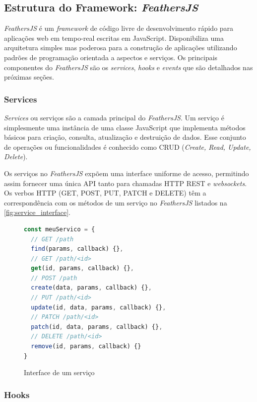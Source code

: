 \subsection{Estrutura do Framework: \textit{FeathersJS}}

\textit{FeathersJS} é um \textit{framework} de código livre de desenvolvimento rápido para aplicações
web em tempo-real escritas em JavaScript. Disponibiliza uma arquitetura simples mas poderosa
para a construção de aplicações utilizando padrões de programação orientada a aspectos e serviços.
Os principais componentes do \textit{FeathersJS} são os \textit{services}, \textit{hooks} e
\textit{events} que são detalhados nas próximas seções.

\subsubsection{Services}\label{subsection:feathers_services}
\textit{Services} ou serviços são a camada principal do \textit{\textit{FeathersJS}}.
Um serviço é simplesmente uma instância de uma classe JavaScript
que implementa métodos básicos para criação, consulta, atualização e
destruição de dados. Esse conjunto de operações ou funcionalidades é conhecido como
CRUD (\textit{Create, Read, Update, Delete}).

Os serviços no \textit{FeathersJS} expõem uma interface uniforme de acesso, permitindo
assim fornecer uma única API tanto para chamadas HTTP REST e \textit{websockets}.
Os verbos HTTP (GET, POST, PUT, PATCH e DELETE) têm a correspondência com
os métodos de um serviço no \textit{\textit{FeathersJS}} listados na \autoref{fig:service_interface}.

\begin{figure}[h]
\caption{Interface de um serviço}
\label{fig:service_interface}
\begin{lstlisting}[language=JavaScript]
const meuServico = {
  // GET /path
  find(params, callback) {},
  // GET /path/<id>
  get(id, params, callback) {},
  // POST /path
  create(data, params, callback) {},
  // PUT /path/<id>
  update(id, data, params, callback) {},
  // PATCH /path/<id>
  patch(id, data, params, callback) {},
  // DELETE /path/<id>
  remove(id, params, callback) {}
}
\end{lstlisting}
\doautor
\end{figure}

\subsubsection{Hooks}

